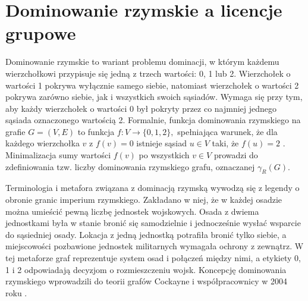 \section{Dominowanie rzymskie a licencje grupowe}

Dominowanie rzymskie to wariant problemu dominacji, w którym każdemu wierzchołkowi przypisuje się jedną z trzech wartości: 0, 1 lub 2. Wierzchołek o wartości 1 pokrywa wyłącznie samego siebie, natomiast wierzchołek o wartości 2 pokrywa zarówno siebie, jak i wszystkich swoich sąsiadów. Wymaga się przy tym, aby każdy wierzchołek o wartości 0 był pokryty przez co najmniej jednego sąsiada oznaczonego wartością 2. Formalnie, funkcja dominowania rzymskiego na grafie $G=(V,E)$ to funkcja $f: V \to \{0,1,2\},$ spełniająca warunek, że dla każdego wierzchołka $v$ z $f(v) = 0$ istnieje sąsiad $u \in V$ taki, że $f(u) = 2$ \cite{Favaron2009}. Minimalizacja sumy wartości $f(v)$ po wszystkich $v \in V$ prowadzi do zdefiniowania tzw. liczby dominowania rzymskiego grafu, oznaczanej $\gamma_R(G)$.

Terminologia i metafora związana z dominacją rzymską wywodzą się z legendy o obronie granic imperium rzymskiego. Zakładano w niej, że w każdej osadzie można umieścić pewną liczbę jednostek wojskowych. Osada z dwiema jednostkami była w stanie bronić się samodzielnie i jednocześnie wysłać wsparcie do sąsiedniej osady. Lokacja z jedną jednostką potrafiła bronić tylko siebie, a miejscowości pozbawione jednostek militarnych wymagała ochrony z zewnątrz. W tej metaforze graf reprezentuje system osad i połączeń między nimi, a etykiety 0, 1 i 2 odpowiadają decyzjom o rozmieszczeniu wojsk. Koncepcję dominowania rzymskiego wprowadzili do teorii grafów Cockayne i współpracownicy w 2004 roku \cite{Cockayne2004}.

